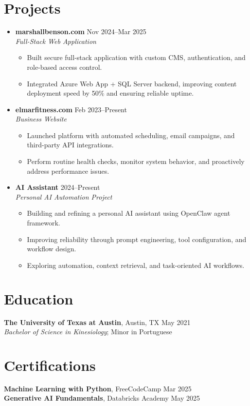 \documentclass[letterpaper,10pt]{article}
\newcommand{\resumeItem}[1]{\item \small{#1}}
\begin{document}
\section*{Projects}
\begin{itemize}
  \item[]
    \textbf{marshallbenson.com} \hfill Nov 2024--Mar 2025 \\
    \textit{Full-Stack Web Application}
  \begin{itemize}
    \resumeItem{Built secure full-stack application with custom CMS, authentication, and role-based access control.}
    \resumeItem{Integrated Azure Web App + SQL Server backend, improving content deployment speed by 50\% and ensuring reliable uptime.}
  \end{itemize}

  \item[]
    \textbf{elmarfitness.com} \hfill Feb 2023--Present \\
    \textit{Business Website}
  \begin{itemize}
    \resumeItem{Launched platform with automated scheduling, email campaigns, and third-party API integrations.}
    \resumeItem{Perform routine health checks, monitor system behavior, and proactively address performance issues.}
  \end{itemize}

  \item[]
    \textbf{AI Assistant} \hfill 2024--Present \\
    \textit{Personal AI Automation Project}
  \begin{itemize}
    \resumeItem{Building and refining a personal AI assistant using OpenClaw agent framework.}
    \resumeItem{Improving reliability through prompt engineering, tool configuration, and workflow design.}
    \resumeItem{Exploring automation, context retrieval, and task-oriented AI workflows.}
  \end{itemize}
\end{itemize}

\section*{Education}
\textbf{The University of Texas at Austin}, Austin, TX \hfill May 2021 \\
\textit{Bachelor of Science in Kinesiology}; Minor in Portuguese

\section*{Certifications}
\textbf{Machine Learning with Python}, FreeCodeCamp \hfill Mar 2025 \\
\textbf{Generative AI Fundamentals}, Databricks Academy \hfill May 2025
\end{document}
